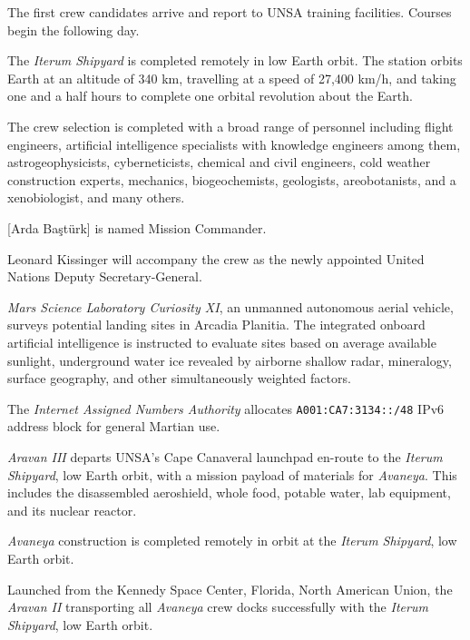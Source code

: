 The first crew candidates arrive and report to UNSA training facilities. Courses begin the following day.
\StopTimelineDate

The {\it Iterum Shipyard} is completed remotely in low Earth orbit. The station orbits Earth at an altitude of 340 km, travelling at a speed of 27,400 km/h, and taking one and a half hours to complete one orbital revolution about the Earth.
\StopTimelineDate

The crew selection is completed with a broad range of personnel including flight engineers, artificial intelligence specialists with knowledge engineers among them, astrogeophysicists, cyberneticists, chemical and civil engineers, cold weather construction experts, mechanics, biogeochemists, geologists, areobotanists, and a xenobiologist, and many others. 

[Arda Baştürk] is named Mission Commander. 

Leonard Kissinger will accompany the crew as the newly appointed United Nations Deputy Secretary-General.
\StopTimelineDate

{\it Mars Science Laboratory Curiosity XI}, an unmanned autonomous aerial vehicle, surveys potential landing sites in Arcadia Planitia. The integrated onboard artificial intelligence is instructed to evaluate sites based on average available sunlight, underground water ice revealed by airborne shallow radar, mineralogy, surface geography, and other simultaneously weighted factors.
\StopTimelineDate

The {\it Internet Assigned Numbers Authority} allocates {\tt A001:CA7:3134::/48} IPv6 address block for general Martian use. 
\StopTimelineDate

{\it Aravan III} departs UNSA's Cape Canaveral launchpad en-route to the {\it Iterum Shipyard}, low Earth orbit, with a mission payload of materials for {\it Avaneya}. This includes the disassembled aeroshield, whole food, potable water, lab equipment, and its nuclear reactor.
\StopTimelineDate

{\it Avaneya} construction is completed remotely in orbit at the {\it Iterum Shipyard}, low Earth orbit.
\StopTimelineDate

Launched from the Kennedy Space Center, Florida, North American Union, the {\it Aravan II} transporting all {\it Avaneya} crew docks successfully with the {\it Iterum Shipyard}, low Earth orbit.
\StopTimelineDate

